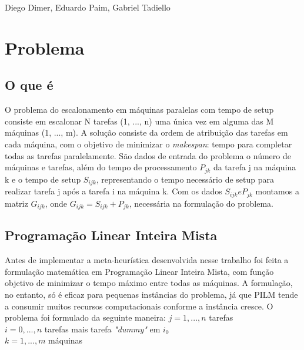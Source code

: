 \documentclass[10pt]{scrartcl}
\begin{document}


\begin{center}
  \Large
  \setlength{\fboxsep}{1em}\setlength{\fboxrule}{0pt}
\normalsize 
Diego Dimer, Eduardo Paim, Gabriel Tadiello \\
 
\end{center}

\pagestyle{fancy}

\medskip
\section{Problema}

\subsection{O que é}
O problema do escalonamento em máquinas paralelas com tempo de setup consiste em escalonar N tarefas (1, ..., n) uma única vez em alguma das M máquinas (1, ..., m). A solução consiste da ordem de atribuição das tarefas em cada máquina, com o objetivo de minimizar o \textit{makespan}: tempo para completar todas as tarefas paralelamente. São dados de entrada do problema o número de máquinas e tarefas, além do tempo de processamento $P_{jk}$ da tarefa j na máquina k e o tempo de setup $S_{ijk}$, representando o tempo necessário de setup para realizar tarefa j após a tarefa i na máquina k. Com os dados $S_{ijk} e P_{jk}$ montamos a matriz $G_{ijk}$, onde $G_{ijk}=S_{ijk}+P_{jk}$, necessária na formulação do problema.

\subsection{Programação Linear Inteira Mista}
Antes de implementar a meta-heurística desenvolvida nesse trabalho foi feita a formulação matemática em Programação Linear Inteira Mista, com função objetivo de minimizar o tempo máximo entre todas as máquinas. A formulação, no entanto, só é eficaz para pequenas instâncias do problema, já que PILM tende a consumir muitos recursos computacionais conforme a instância cresce.
O problema foi formulado da seguinte maneira:
 $j = 1, ..., n$  tarefas \\ $i = 0, ..., n$ tarefas mais tarefa \textit{"dummy"} em $i_0$\\ $k = 1, ..., m$ máquinas
\end{document}
